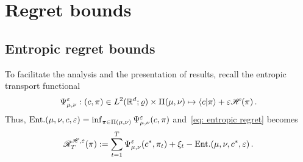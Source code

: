 \section{Regret bounds}\label{app: regret bounds}

\subsection{Entropic regret bounds}\label{subsec: entropic regret}


To facilitate the analysis and the presentation of results, recall the entropic transport functional
\[
    \Psi_{\mu,\nu}^\varepsilon:(c,\pi)\in L^2(\mathbb{R}^d;\varrho)\times\Pi(\mu,\nu)\mapsto \langle c\vert\pi\rangle + \varepsilon\mathscr{H}(\pi)\,.
\]
Thus, $\text{Ent.}(\mu,\nu,c,\varepsilon)=\inf_{\pi\in\Pi(\mu,\nu)}\Psi_{\mu,\nu}^\varepsilon(c,\pi)$ and~\eqref{eq: entropic regret} becomes
\[
    \mathscr{R}_T^{\mathscr{H},\varepsilon}(\pi):= \sum_{t=1}^T \Psi_{\mu,\nu}^\varepsilon(c^*,\pi_t)+\xi_t - \text{Ent.}(\mu,\nu,c^*,\varepsilon)\,.
\]

\ThmEntropicRegret*


